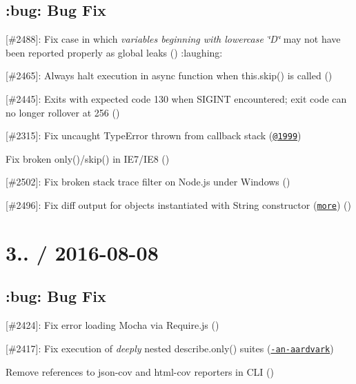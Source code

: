 \subsection*{\+:bug\+: Bug Fix}


\begin{DoxyItemize}
\item \mbox{[}\#2488\mbox{]}\+: Fix case in which {\itshape variables beginning with lowercase \char`\"{}\+D\char`\"{}} may not have been reported properly as global leaks (\href{https://github.com/JustATrick}{\tt }) \+:laughing\+:
\item \mbox{[}\#2465\mbox{]}\+: Always halt execution in async function when {\ttfamily this.\+skip()} is called (\href{https://github.com/boneskull}{\tt })
\item \mbox{[}\#2445\mbox{]}\+: Exits with expected code 130 when {\ttfamily S\+I\+G\+I\+NT} encountered; exit code can no longer rollover at 256 (\href{https://github.com/munter}{\tt })
\item \mbox{[}\#2315\mbox{]}\+: Fix uncaught Type\+Error thrown from callback stack (\href{https://github.com/1999}{\tt @1999})
\item Fix broken {\ttfamily only()}/{\ttfamily skip()} in I\+E7/\+I\+E8 (\href{https://github.com/boneskull}{\tt })
\item \mbox{[}\#2502\mbox{]}\+: Fix broken stack trace filter on Node.\+js under Windows (\href{https://github.com/boneskull}{\tt })
\item \mbox{[}\#2496\mbox{]}\+: Fix diff output for objects instantiated with {\ttfamily String} constructor (\href{https://youtrack.jetbrains.com/issue/WEB-23383}{\tt more}) (\href{https://github.com/boneskull}{\tt })
\end{DoxyItemize}

\section*{3.. / 2016-\/08-\/08}

\subsection*{\+:bug\+: Bug Fix}


\begin{DoxyItemize}
\item \mbox{[}\#2424\mbox{]}\+: Fix error loading Mocha via Require.\+js (\href{https://github.com/boneskull}{\tt })
\item \mbox{[}\#2417\mbox{]}\+: Fix execution of {\itshape deeply} nested {\ttfamily describe.\+only()} suites (\href{https://github.com/not-an-aardvark}{\tt -\/an-\/aardvark})
\item Remove references to {\ttfamily json-\/cov} and {\ttfamily html-\/cov} reporters in C\+LI (\href{https://github.com/boneskull}{\tt })
\end{DoxyItemize}

